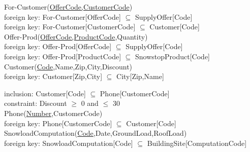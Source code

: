 {{\color{ForestGreen}For-Customer(\underline{OfferCode,CustomerCode})}\\
{\color{Orange}\hspace{2mm} foreign key: {\color{Magenta}For-Customer[OfferCode] $\subseteq$ SupplyOffer[Code]}} \\
{\color{Orange}\hspace{2mm} foreign key: {\color{Magenta}For-Customer[CustomerCode] $\subseteq$ Customer[Code]}} \\

{\color{ForestGreen}Offer-Prod(\underline{OfferCode,ProductCode},Quantity)}\\
{\color{Orange}\hspace{2mm} foreign key: {\color{Magenta}Offer-Prod[OfferCode] $\subseteq$ SupplyOffer[Code]}} \\
{\color{Orange}\hspace{2mm} foreign key: {\color{Magenta}Offer-Prod[ProductCode] $\subseteq$ SnowstopProduct[Code]}} \\

{\color{ForestGreen}Customer(\underline{Code},Name,Zip,City,Discount)}\\
{\color{Orange}\hspace{2mm} foreign key: {\color{Magenta}Customer[Zip,City] $\subseteq$ City[Zip,Name]}} \\
{\color{Orange}\hspace{2mm} inclusion: {\color{Magenta}Customer[Code] $\subseteq$ Phone[CustomerCode]} \\
{\color{Orange}\hspace{2mm} constraint: {\color{Magenta}Discount $\geqslant$  0 and $\leqslant$ 30}} \\

{\color{ForestGreen}Phone(\underline{Number},CustomerCode)}\\
{\color{Orange}\hspace{2mm} foreign key: {\color{Magenta}Phone[CustomerCode] $\subseteq$ Customer[Code]}} \\

{\color{ForestGreen}SnowloadComputation(\underline{Code},Date,GroundLoad,RoofLoad)}\\
{\color{Orange}\hspace{2mm} foreign key: {\color{Magenta}SnowloadComputation[Code] $\subseteq$ BuildingSite[ComputationCode]}} \\

\pagebreak

}}
